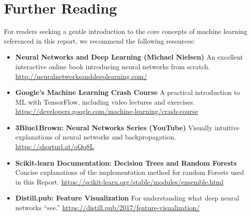 \section{Further Reading}
\label{sec:further-reading}

For readers seeking a gentle introduction to the core concepts of machine learning referenced in this report, we recommend the following resources:

\begin{itemize}
  \item \textbf{Neural Networks and Deep Learning (Michael Nielsen)} \newline
  An excellent interactive online book introducing neural networks from scratch.  \newline
  \url{http://neuralnetworksanddeeplearning.com/}  
  
  \item \textbf{Google's Machine Learning Crash Course}  \newline
  A practical introduction to ML with TensorFlow, including video lectures and exercises.  \newline
  \url{https://developers.google.com/machine-learning/crash-course}

  \item \textbf{3Blue1Brown: Neural Networks Series (YouTube)}  \newline
  Visually intuitive explanations of neural networks and backpropagation.  \newline
  \url{https://shorturl.at/oQq8L}
  
  \item \textbf{Scikit-learn Documentation: Decision Trees and Random Forests}  \newline
  Concise explanations of the implementation method for random Forests used in this Report.  \newline
  \url{https://scikit-learn.org/stable/modules/ensemble.html}
  
  \item \textbf{Distill.pub: Feature Visualization}  \newline
  For understanding what deep neural networks “see.”  \newline
  \url{https://distill.pub/2017/feature-visualization/}
\end{itemize}